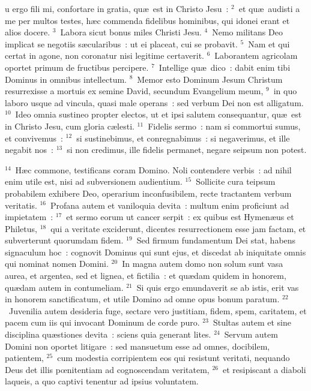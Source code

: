\bchapter
{}u ergo fili mi, confortare in gratia, qu\ae\ est in Christo Jesu~:
${}^{2}$~et qu\ae\ audisti a me per multos testes, h\ae c commenda fidelibus hominibus, qui idonei erant et alios docere.
${}^{3}$~Labora sicut bonus miles Christi Jesu.
${}^{4}$~Nemo militans Deo implicat se negotiis s\ae cularibus~: ut ei placeat, cui se probavit.
${}^{5}$~Nam et qui certat in agone, non coronatur nisi legitime certaverit.
${}^{6}$~Laborantem agricolam oportet primum de fructibus percipere.
${}^{7}$~Intellige qu\ae\ dico~: dabit enim tibi Dominus in omnibus intellectum.
${}^{8}$~Memor esto Dominum Jesum Christum resurrexisse a mortuis ex semine David, secundum Evangelium meum,
${}^{9}$~in quo laboro usque ad vincula, quasi male operans~: sed verbum Dei non est alligatum.
${}^{10}$~Ideo omnia sustineo propter electos, ut et ipsi salutem consequantur, qu\ae\ est in Christo Jesu, cum gloria c\ae lesti.
${}^{11}$~Fidelis sermo~: nam si commortui sumus, et convivemus~:
${}^{12}$~si sustinebimus, et conregnabimus~: si negaverimus, et ille negabit nos~:
${}^{13}$~si non credimus, ille fidelis permanet, negare seipsum non potest.


${}^{14}$~H\ae c commone, testificans coram Domino. Noli contendere verbis~: ad nihil enim utile est, nisi ad subversionem audientium.
${}^{15}$~Sollicite cura teipsum probabilem exhibere Deo, operarium inconfusibilem, recte tractantem verbum veritatis.
${}^{16}$~Profana autem et vaniloquia devita~: multum enim proficiunt ad impietatem~:
${}^{17}$~et sermo eorum ut cancer serpit~: ex quibus est Hymen\ae us et Philetus,
${}^{18}$~qui a veritate exciderunt, dicentes resurrectionem esse jam factam, et subverterunt quorumdam fidem.
${}^{19}$~Sed firmum fundamentum Dei stat, habens signaculum hoc~: cognovit Dominus qui sunt ejus, et discedat ab iniquitate omnis qui nominat nomen Domini.
${}^{20}$~In magna autem domo non solum sunt vasa aurea, et argentea, sed et lignea, et fictilia~: et qu\ae dam quidem in honorem, qu\ae dam autem in contumeliam.
${}^{21}$~Si quis ergo emundaverit se ab istis, erit vas in honorem sanctificatum, et utile Domino ad omne opus bonum paratum.
${}^{22}$~Juvenilia autem desideria fuge, sectare vero justitiam, fidem, spem, caritatem, et pacem cum iis qui invocant Dominum de corde puro.
${}^{23}$~Stultas autem et sine disciplina qu\ae stiones devita~: sciens quia generant lites.
${}^{24}$~Servum autem Domini non oportet litigare~: sed mansuetum esse ad omnes, docibilem, patientem,
${}^{25}$~cum modestia corripientem eos qui resistunt veritati, nequando Deus det illis pœnitentiam ad cognoscendam veritatem,
${}^{26}$~et resipiscant a diaboli laqueis, a quo captivi tenentur ad ipsius voluntatem.

